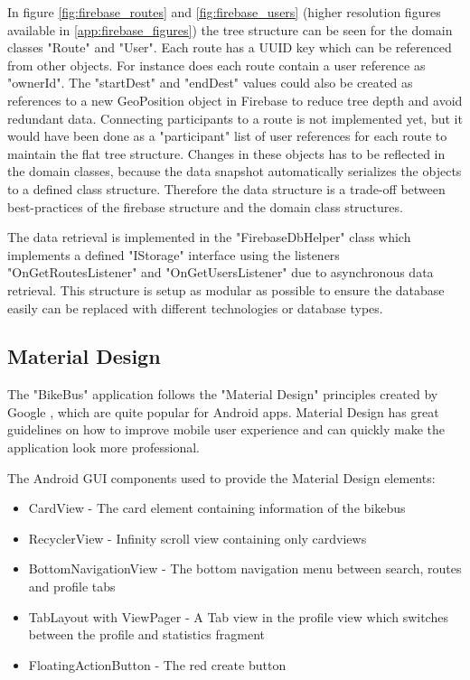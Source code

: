 In figure \ref{fig:firebase_routes} and \ref{fig:firebase_users} (higher resolution figures available in \ref{app:firebase_figures}) the tree structure can be seen for the domain classes "Route" and "User". Each route has a UUID key which can be referenced from other objects. For instance does each route contain a user reference as "ownerId". The "startDest" and "endDest" values could also be created as references to a new GeoPosition object in Firebase to reduce tree depth and avoid redundant data.
Connecting participants to a route is not implemented yet, but it would have been done as a "participant" list of user references for each route to maintain the flat tree structure. Changes in these objects has to be reflected in the domain classes, because the data snapshot automatically serializes the objects to a defined class structure. Therefore the data structure is a trade-off between best-practices of the firebase structure and the domain class structures.

The data retrieval is implemented in the "FirebaseDbHelper" class which implements a defined "IStorage" interface using the listeners "OnGetRoutesListener" and "OnGetUsersListener" due to asynchronous data retrieval. This structure is setup as modular as possible to ensure the database easily can be replaced with different technologies or database types. 

\subsection{Material Design}
The "BikeBus" application follows the "Material Design" principles created by Google \cite{material}, which are quite popular for Android apps. Material Design has great guidelines on how to improve mobile user experience and can quickly make the application look more professional.

The Android GUI components used to provide the Material Design elements:
\begin{itemize}
    \item CardView - The card element containing information of the bikebus
    \item RecyclerView - Infinity scroll view containing only cardviews
    \item BottomNavigationView - The bottom navigation menu between search, routes and profile tabs
    \item TabLayout with ViewPager - A Tab view in the profile view which switches between the profile and statistics fragment
    \item FloatingActionButton - The red create button
\end{itemize}

